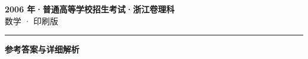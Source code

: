 \documentclass[zihao=5, a4paper]{ctexart}
\begin{document}
\begin{center}
  {\Large\bfseries 2006 年·普通高等学校招生考试·浙江卷理科}\\[4pt]
  {\large 数学 · 印刷版}
\end{center}
\medskip
{}

\par\bigskip\hrule\bigskip
{}
\begin{center}{\large\bfseries 参考答案与详细解析}\end{center}
\smallskip

\end{document}
